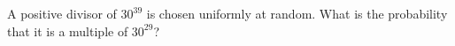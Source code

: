 A positive divisor of $30^{39}$ is chosen uniformly at random. What is the probability that it is a multiple of $30^{29}$?
